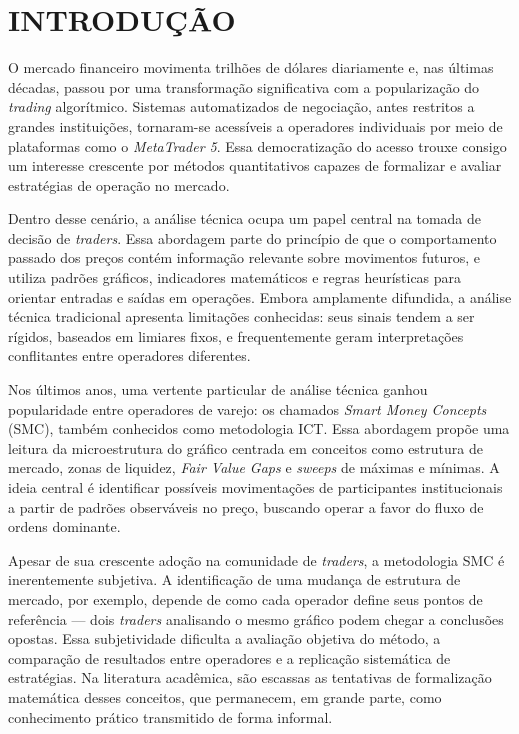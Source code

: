 \chapter{INTRODUÇÃO}

O mercado financeiro movimenta trilhões de dólares diariamente e, nas últimas décadas, passou por uma transformação significativa com a popularização do \textit{trading} algorítmico. Sistemas automatizados de negociação, antes restritos a grandes instituições, tornaram-se acessíveis a operadores individuais por meio de plataformas como o \textit{MetaTrader 5}. Essa democratização do acesso trouxe consigo um interesse crescente por métodos quantitativos capazes de formalizar e avaliar estratégias de operação no mercado.

Dentro desse cenário, a análise técnica ocupa um papel central na tomada de decisão de \textit{traders}. Essa abordagem parte do princípio de que o comportamento passado dos preços contém informação relevante sobre movimentos futuros, e utiliza padrões gráficos, indicadores matemáticos e regras heurísticas para orientar entradas e saídas em operações. Embora amplamente difundida, a análise técnica tradicional apresenta limitações conhecidas: seus sinais tendem a ser rígidos, baseados em limiares fixos, e frequentemente geram interpretações conflitantes entre operadores diferentes.

Nos últimos anos, uma vertente particular de análise técnica ganhou popularidade entre operadores de varejo: os chamados \textit{Smart Money Concepts} (SMC), também conhecidos como metodologia ICT. Essa abordagem propõe uma leitura da microestrutura do gráfico centrada em conceitos como estrutura de mercado, zonas de liquidez, \textit{Fair Value Gaps} e \textit{sweeps} de máximas e mínimas. A ideia central é identificar possíveis movimentações de participantes institucionais a partir de padrões observáveis no preço, buscando operar a favor do fluxo de ordens dominante.

Apesar de sua crescente adoção na comunidade de \textit{traders}, a metodologia SMC é inerentemente subjetiva. A identificação de uma mudança de estrutura de mercado, por exemplo, depende de como cada operador define seus pontos de referência --- dois \textit{traders} analisando o mesmo gráfico podem chegar a conclusões opostas. Essa subjetividade dificulta a avaliação objetiva do método, a comparação de resultados entre operadores e a replicação sistemática de estratégias. Na literatura acadêmica, são escassas as tentativas de formalização matemática desses conceitos, que permanecem, em grande parte, como conhecimento prático transmitido de forma informal.

